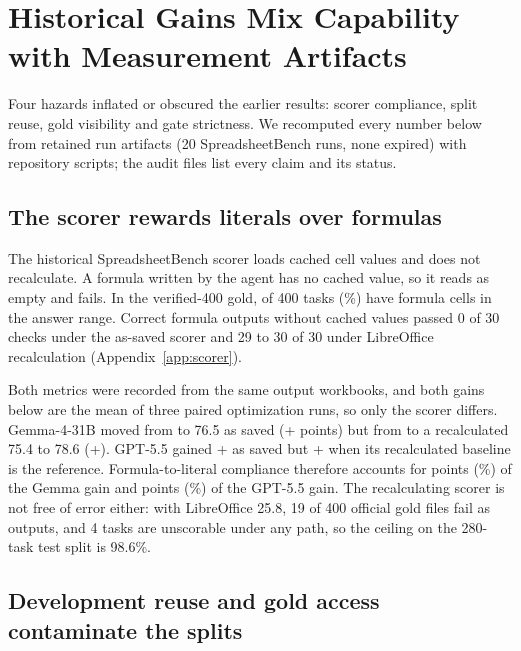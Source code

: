 \section{Historical Gains Mix Capability with Measurement Artifacts}
\label{sec:problem}

Four hazards inflated or obscured the earlier \capevolve{} results: scorer compliance, split reuse, gold visibility and gate strictness. We recomputed every number below from retained run artifacts (20 SpreadsheetBench runs, none expired) with repository scripts; the audit files list every claim and its status.



\subsection{The scorer rewards literals over formulas}

The historical SpreadsheetBench scorer loads cached cell values and does not recalculate. A formula written by the agent has no cached value, so it reads as empty and fails. In the verified-400 gold, \histFormulaGoldTasks{} of 400 tasks (\histFormulaGoldPct{}\%) have formula cells in the answer range. Correct formula outputs without cached values passed 0 of 30 checks under the as-saved scorer and 29 to 30 of 30 under LibreOffice recalculation (Appendix~\ref{app:scorer}).

Both metrics were recorded from the same output workbooks, and both gains below are the mean of three paired optimization runs, so only the scorer differs. Gemma-4-31B moved from \histGemmaBaseSaved{} to 76.5 as saved (+\histGemmaDeltaSaved{} points) but from \histGemmaBaseRecalc{} to a recalculated 75.4 to 78.6 (+\histGemmaDeltaRecalc{}). GPT-5.5 gained +\histGptDeltaSaved{} as saved but +\histGptDeltaRecalc{} when its \histGptBaseRecalc{} recalculated baseline is the reference. Formula-to-literal compliance therefore accounts for \histGemmaCompliancePts{} points (\histGemmaComplianceShare{}\%) of the Gemma gain and \histGptCompliancePts{} points (\histGptComplianceShare{}\%) of the GPT-5.5 gain. The recalculating scorer is not free of error either: with LibreOffice 25.8, 19 of 400 official gold files fail as outputs, and 4 tasks are unscorable under any path, so the ceiling on the 280-task test split is 98.6\%.

\subsection{Development reuse and gold access contaminate the splits}

